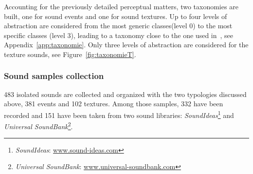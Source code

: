 \documentclass[12pt]{elsarticle}
\newcommand{\cf}{cf.}
\begin{document}

Accounting for the previously detailed perceptual matters, two taxonomies are built, one for sound events and one for sound textures. Up to four levels of abstraction are considered from the most generic classes(level 0) to the most specific classes (level 3), leading to a taxonomy close to the one used in~\cite{Salamon14}, see Appendix~\ref{app:taxonomie}. Only three levels of abstraction are considered for the texture sounds, see Figure~\ref{fig:taxonomieT}.


\subsubsection*{Sound samples collection}


483 isolated sounds are collected and organized with the two typologies discussed above, 381 events and 102 textures. Among those samples, 332 have been recorded and 151 have been taken from two sound libraries: \emph{SoundIdeas}\footnote{\emph{SoundIdeas}: \url{www.sound-ideas.com}} and \emph{Universal SoundBank}\footnote{\emph{Universal SoundBank}: \url{www.universal-soundbank.com}}.

\end{document}
